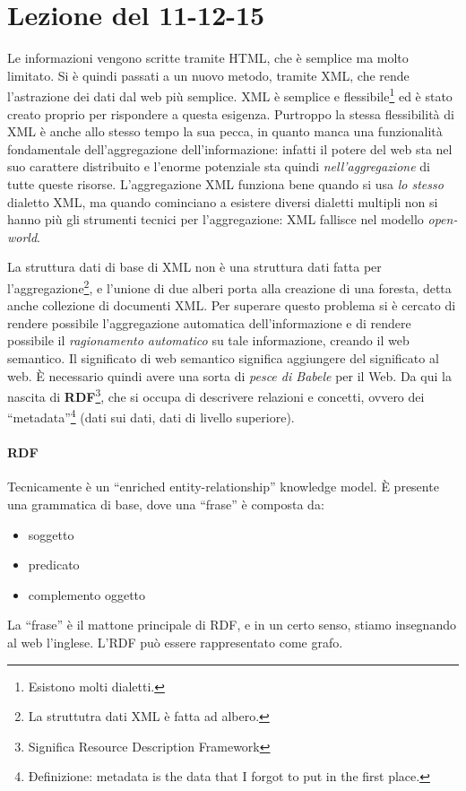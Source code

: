 \section{Lezione del 11-12-15}

Le informazioni vengono scritte tramite HTML, che \`e semplice ma molto limitato. Si \`e quindi passati a un nuovo metodo, tramite XML, che rende l'astrazione dei dati dal web pi\`u semplice. XML \`e semplice e flessibile\footnote{Esistono molti dialetti.} ed \`e stato creato proprio per rispondere a questa esigenza. Purtroppo la stessa flessibilit\`a di XML \`e anche allo stesso tempo la sua pecca, in quanto manca una funzionalit\`a fondamentale dell'aggregazione dell'informazione: infatti il potere del web sta nel suo carattere distribuito e l'enorme potenziale sta quindi \textit{nell'aggregazione} di tutte queste risorse. L'aggregazione XML funziona bene quando si usa \textit{lo stesso} dialetto XML, ma quando cominciano a esistere diversi dialetti multipli non si hanno pi\`u gli strumenti tecnici per l'aggregazione: XML fallisce nel modello \textit{open-world}.

La struttura dati di base di XML non \`e una struttura dati fatta per l'aggregazione\footnote{La struttutra dati XML \`e fatta ad albero.}, e l'unione di due alberi porta alla creazione di una foresta, detta anche collezione di documenti XML. Per superare questo problema si \`e cercato di rendere possibile l'aggregazione automatica dell'informazione e di rendere possibile il \textit{ragionamento automatico} su tale informazione, creando il web semantico. Il significato di web semantico significa aggiungere del significato al web. \`E necessario quindi avere una sorta di \textit{pesce di Babele} per il Web. Da qui la nascita di \textbf{RDF}\footnote{Significa Resource Description Framework}, che si occupa di descrivere relazioni e concetti, ovvero dei ``metadata''\footnote{Ðefinizione: metadata is the data that I forgot to put in the first place.} (dati sui dati, dati di livello superiore).

\paragraph*{RDF}Tecnicamente \`e un ``enriched entity-relationship'' knowledge model. \`E presente una grammatica di base, dove una ``frase'' \`e composta da:
\begin{itemize}

\item soggetto
\item predicato
\item complemento oggetto
  
\end{itemize}
La ``frase'' \`e il mattone principale di RDF, e in un certo senso, stiamo insegnando al web l'inglese. L'RDF pu\`o essere rappresentato come grafo.


